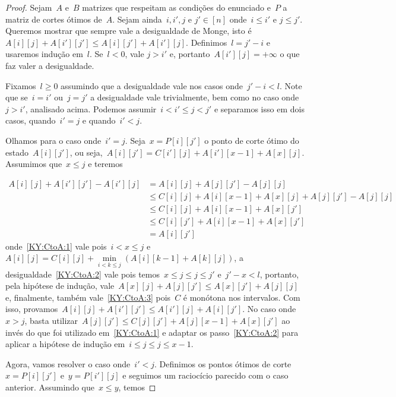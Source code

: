 \begin{proof}
Sejam~$A$ e~$B$ matrizes que respeitam as condições do enunciado e~$P$ a matriz de cortes ótimos de~$A$. Sejam ainda~$i,i',j$ e $j' \in [n]$ onde~$i \leq i'$ e $j \leq j'$. Queremos mostrar que sempre vale a desigualdade de Monge, isto é~${A[i][j] + A[i'][j'] \leq A[i][j'] + A[i'][j]}$. Definimos~$l = j' - i$ e usaremos indução em~$l$. Se~${l < 0}$, vale ${j > i'}$ e, portanto~${A[i'][j] = +\infty}$ o que faz valer a desigualdade.

Fixamos~$l \geq 0$ assumindo que a desigualdade vale nos casos onde~${j' - i < l}$. Note que se~${i = i'}$ ou~${j = j'}$ a desigualdade vale trivialmente, bem como no caso onde~${j > i'}$, analisado acima. Podemos assumir~$i < i' \leq j < j'$ e separamos isso em dois casos, quando~$i' = j$ e quando~$i' < j$.

Olhamos para o caso onde~${i' = j}$. Seja~${x = P[i][j']}$ o ponto de corte ótimo do estado~$A[i][j']$, ou seja,~${A[i][j'] = C[i'][j] + A[i'][x-1] + A[x][j]}$. Assumimos que~${x \leq j}$ e teremos

\begin{align}
A[i][j] + A[i'][j'] - A[i'][j] &= A[i][j] + A[j][j'] - A[j][j] \nonumber \\
                               &\leq C[i][j] + A[i][x-1] + A[x][j] + A[j][j'] - A[j][j] \label{KY:CtoA:1} \\
                               &\leq C[i][j] + A[i][x-1] + A[x][j'] \label{KY:CtoA:2} \\
                               &\leq C[i][j'] + A[i][x-1] + A[x][j'] \label{KY:CtoA:3} \\
                               &= A[i][j']  \nonumber
\end{align}
onde~\eqref{KY:CtoA:1} vale pois~${i < x \leq j}$ e~${A[i][j] = C[i][j] + \min\limits_{i < k \leq j}(A[i][k-1] + A[k][j])}$, a desigualdade~\eqref{KY:CtoA:2} vale pois temos~${x \leq j \leq j \leq j'}$ e~$j' - x < l$, portanto, pela hipótese de indução, vale~${A[x][j] + A[j][j'] \leq A[x][j'] + A[j][j]}$ e, finalmente, também vale~\eqref{KY:CtoA:3} pois~$C$ é monótona nos intervalos. Com isso, provamos~${A[i][j] + A[i'][j'] \leq A[i'][j] + A[i][j']}$. No caso onde~${x > j}$, basta utilizar~${A[j][j'] \leq C[j][j'] + A[j][x-1] + A[x][j']}$ ao invés do que foi utilizado em~\eqref{KY:CtoA:1} e adaptar os passo~\eqref{KY:CtoA:2} para aplicar a hipótese de indução em~${i \leq j \leq j \leq x-1}$.

Agora, vamos resolver o caso onde~${i' < j}$. Definimos os pontos ótimos de corte~${x = P[i][j']}$ e~${y = P[i'][j]}$ e seguimos um raciocício parecido com o caso anterior. Assumindo que~${x \leq y}$, temos 


\end{proof}
